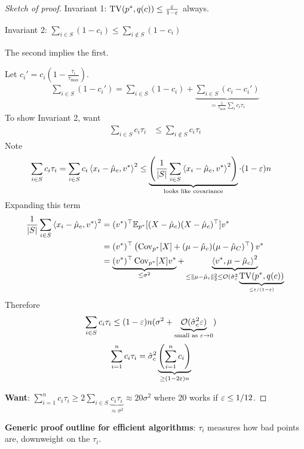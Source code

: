 \begin{proof}[Sketch of proof]
  Invariant 1: $\operatorname{TV}(p^*, q(c)) \leq \frac{\varepsilon}{1-\varepsilon}$ always.

  Invariant 2: $\sum_{i \in S} (1 - c_i) \leq \sum_{i \not\in S}(1 - c_i)$

  The second implies the first.

  Let $c_i' = c_i \left( 1 - \frac{\tau_i}{\tau_{\max}} \right)$.
  \begin{align}
    \sum_{i \in S} (1 - c_i') = \sum_{i \in S} (1 - c_i) +
    \underbrace{\sum_{i \in S} (c_i - c_i')}_{
      =\frac{1}{\tau_\max} \sum_i c_i \tau_i
    }
  \end{align}
  To show Invariant 2, want
  \begin{align}
    \sum_{i \in S} c_i \tau_i &\leq \sum_{i \not\in S} c_i \tau_i
  \end{align}
  Note
  \begin{align}
    \sum_{i \in S} c_i \tau_i
    &= \sum_{i \in S} c_i \braket{x_i - \hat\mu_c, v^*}^2
    \leq \underbrace{\left(\frac{1}{\lvert S \rvert} \sum_{i \in S} \braket{x_i - \hat\mu_c, v^*}^2\right)}_{\text{looks like covariance}}
  \cdot (1 - \varepsilon)n
  \end{align}
  Expanding this term
  \begin{align}
    \frac{1}{\lvert S \rvert} \sum_{i \in S} \braket{x_i - \hat\mu_c, v^*}^2
    &= (v^*)^\top \mathbb{E}_{p^*}[(X - \hat\mu_c) (X - \hat\mu_c)^\top] v^* \\
    &= (v^*)^\top \left(
      \operatorname{Cov}_{p^*}[X] + (\mu - \hat\mu_c)(\mu - \hat\mu_C)^\top
    \right) v^* \\
    &= \underbrace{(v^*)^\top \operatorname{Cov}_{p^*}[X] v^*}_{\leq \sigma^2}
    + \underbrace{\braket{v^*, \mu - \hat\mu_c}^2}_{\leq \|\mu - \hat\mu_c\|_2^2
    \leq \mathcal{O}(\hat\sigma_c^2 \underbrace{\operatorname{TV}(p^*, q(c))}_{\leq \varepsilon/(1-\varepsilon)}}
  \end{align}
  Therefore
  \begin{align}
    \sum_{i \in S} c_i \tau_i &\leq (1 - \varepsilon) n (\sigma^2 + 
    \underbrace{\mathcal{O}(\hat\sigma_c^2 \varepsilon)}_{\text{small as }\varepsilon \to 0})
  \end{align}
  \begin{align}
    \sum_{i=1}^n c_i \tau_i
    &= \hat\sigma_c^2 \underbrace{\left(\sum_{i=1}^n c_i\right)}_{\geq (1 - 2 \varepsilon) n}
  \end{align}

  \textbf{Want}: $\sum_{i=1}^n c_i \tau_i \geq 2 \sum_{i \in S} \underbrace{c_i \tau_i}_{\approx \sigma^2} \approx 20 \sigma^2$ where 20 works if $\varepsilon \leq 1/12$.
\end{proof}

\textbf{Generic proof outline for efficient algorithms}: $\tau_i$ measures how bad points are, downweight on the $\tau_i$.
